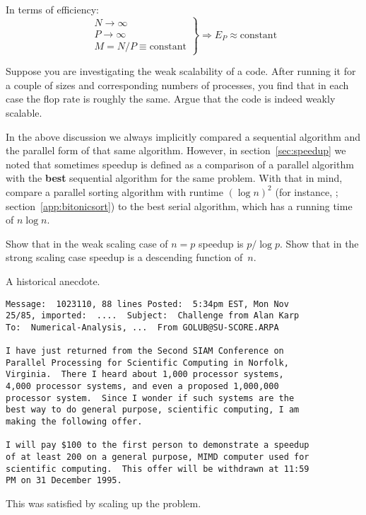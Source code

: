 In terms of efficiency:
\[ \left.
\begin{array}{l}
  N\rightarrow\infty\\ P\rightarrow\infty\\ M=N/P\equiv\mathrm{constant}
\end{array}
\right\} \Rightarrow E_P\approx\mathrm{constant}
\]

\begin{exercise}
  Suppose you are investigating the weak scalability of a code.
  After running it for a couple of sizes and corresponding numbers
  of processes, you find that in each case the flop rate is roughly the same.
  Argue that the code is indeed weakly scalable.
\end{exercise}

\begin{exercise}
  In the above discussion we always implicitly compared a sequential 
  algorithm and the parallel form of that same algorithm. However, 
  in section~\ref{sec:speedup} we noted that sometimes speedup is defined
  as a comparison of a parallel algorithm with the \textbf{best} sequential
  algorithm for the same problem. With that in mind, compare a parallel sorting
  algorithm with runtime $(\log n)^2$ (for instance, ;
  section~\ref{app:bitonicsort}) to the best serial algorithm, which has 
  a running time of $n\log n$.

  Show that in the weak scaling case of $n=p$ speedup is $p/\log p$.
  Show that in the strong scaling case speedup is a descending function of~$n$.
\end{exercise}

\begin{remark}
  A historical anecdote.
  
\begin{verbatim}
Message:  1023110, 88 lines Posted:  5:34pm EST, Mon Nov
25/85, imported:  ....  Subject:  Challenge from Alan Karp
To:  Numerical-Analysis, ...  From GOLUB@SU-SCORE.ARPA

I have just returned from the Second SIAM Conference on
Parallel Processing for Scientific Computing in Norfolk,
Virginia.  There I heard about 1,000 processor systems,
4,000 processor systems, and even a proposed 1,000,000
processor system.  Since I wonder if such systems are the
best way to do general purpose, scientific computing, I am
making the following offer.

I will pay $100 to the first person to demonstrate a speedup
of at least 200 on a general purpose, MIMD computer used for
scientific computing.  This offer will be withdrawn at 11:59
PM on 31 December 1995.
\end{verbatim}

This was satisfied by scaling up the problem.
\end{remark}

